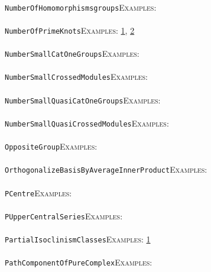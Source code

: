 \documentclass[a4paper,11pt]{report}
\begin{document}
{{ \\
 \texttt{NumberOfHomomorphisms{\textunderscore}groups}{\nobreakspace}{\nobreakspace}{\nobreakspace}{\nobreakspace}\textsc{Examples:} \\
 \\
 \texttt{NumberOfPrimeKnots}{\nobreakspace}{\nobreakspace}{\nobreakspace}{\nobreakspace}\textsc{Examples:} \href{../www/SideLinks/About/aboutQuandles2.html} {1}{\nobreakspace}, \href{../www/SideLinks/About/aboutQuandles.html} {2}{\nobreakspace} \\
 \\
 \texttt{NumberSmallCatOneGroups}{\nobreakspace}{\nobreakspace}{\nobreakspace}{\nobreakspace}\textsc{Examples:} \\
 \\
 \texttt{NumberSmallCrossedModules}{\nobreakspace}{\nobreakspace}{\nobreakspace}{\nobreakspace}\textsc{Examples:} \\
 \\
 \texttt{NumberSmallQuasiCatOneGroups}{\nobreakspace}{\nobreakspace}{\nobreakspace}{\nobreakspace}\textsc{Examples:} \\
 \\
 \texttt{NumberSmallQuasiCrossedModules}{\nobreakspace}{\nobreakspace}{\nobreakspace}{\nobreakspace}\textsc{Examples:} \\
 \\
 \texttt{OppositeGroup}{\nobreakspace}{\nobreakspace}{\nobreakspace}{\nobreakspace}\textsc{Examples:} \\
 \\
 \texttt{OrthogonalizeBasisByAverageInnerProduct}{\nobreakspace}{\nobreakspace}{\nobreakspace}{\nobreakspace}\textsc{Examples:} \\
 \\
 \texttt{PCentre}{\nobreakspace}{\nobreakspace}{\nobreakspace}{\nobreakspace}\textsc{Examples:} \\
 \\
 \texttt{PUpperCentralSeries}{\nobreakspace}{\nobreakspace}{\nobreakspace}{\nobreakspace}\textsc{Examples:} \\
 \\
 \texttt{PartialIsoclinismClasses}{\nobreakspace}{\nobreakspace}{\nobreakspace}{\nobreakspace}\textsc{Examples:} \href{../www/SideLinks/About/aboutBogomolov.html} {1}{\nobreakspace} \\
 \\
 \texttt{PathComponentOfPureComplex}{\nobreakspace}{\nobreakspace}{\nobreakspace}{\nobreakspace}\textsc{Examples:} \\
}}
\end{document}

